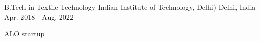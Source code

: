 

\begin{cventries}

  \cventry
    {B.Tech in Textile Technology} %
    {Indian Institute of Technology, Delhi)} %
    {Delhi, India} %
    {Apr. 2018 - Aug. 2022} %
    {
      \begin{cvitems} %
        \item {ALO startup }
      \end{cvitems}
    }

\end{cventries}

